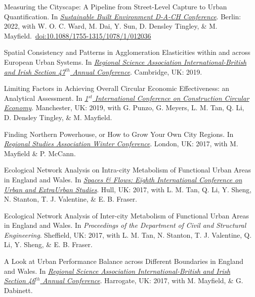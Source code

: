 \documentclass[10pt]{article}
\begin{document}
\begin{etaremune}[leftmargin=0ex, topsep=0ex]
	\item Measuring the Cityscape: A Pipeline from Street-Level Capture to Urban Quantification. In \emph{\href{https://www.sbe22.berlin}{Sustainable Built Environment D-A-CH Conference}}. Berlin: 2022, with W. O. C. Ward, M. Dai, Y. Sun, D. Densley Tingley, \& M. Mayfield.~\href{https://doi.org/10.1088/1755-1315/1078/1/012036}{doi:10.1088/1755-1315/1078/1/012036}
	
	\item Spatial Consistency and Patterns in Agglomeration Elasticities within and across European Urban Systems. In \emph{\href{http://www.rsai-bis.org/previous-conferences.html}{Regional Science Association International-British and Irish Section 47$^{th}$ Annual Conference}}. Cambridge, UK: 2019.
	
	\item Limiting Factors in Achieving Overall Circular Economic Effectiveness: an Analytical Assessment. In \emph{\href{http://www.confercare.manchester.ac.uk/events/iccce2019/programme/}{1$^{st}$ International Conference on Construction Circular Economy}}. Manchester, UK: 2019, with G. Punzo, G. Meyers, L. M. Tan, Q. Li, D. Densley Tingley, \& M. Mayfield.
	
	\item Finding Northern Powerhouse, or How to Grow Your Own City Regions. In \emph{\href{https://www.regionalstudies.org/events/rsa-winter-2017/}{Regional Studies Association Winter Conference}}. London, UK: 2017, with M. Mayfield \& P. McCann.
	
	\item Ecological Network Analysis on Intra-city Metabolism of Functional Urban Areas in England and Wales. In \emph{\href{https://spacesandflows.com/about/history/2017-conference}{Spaces \& Flows: Eighth International Conference on Urban and ExtraUrban Studies}}. Hull, UK: 2017, with L. M. Tan, Q. Li, Y. Sheng, N. Stanton, T. J. Valentine, \& E. B. Fraser.\label{c2rise.net}
	
	\item Ecological Network Analysis of Inter-city Metabolism of Functional Urban Areas in England and Wales. In \emph{Proceedings of the Department of Civil and Structural Engineering}. Sheffield, UK: 2017, with L. M. Tan, N. Stanton, T. J. Valentine, Q. Li, Y. Sheng, \& E. B. Fraser.\label{c1rise.net}
	
	\item A Look at Urban Performance Balance across Different Boundaries in England and Wales. In \emph{\href{http://www.rsai-bis.org/previous-conferences.html}{Regional Science Association International-British and Irish Section 46$^{th}$ Annual Conference}}. Harrogate, UK: 2017, with M. Mayfield, \& G. Dabinett.\label{rsai-bi}
	

\end{etaremune}
\end{document}
